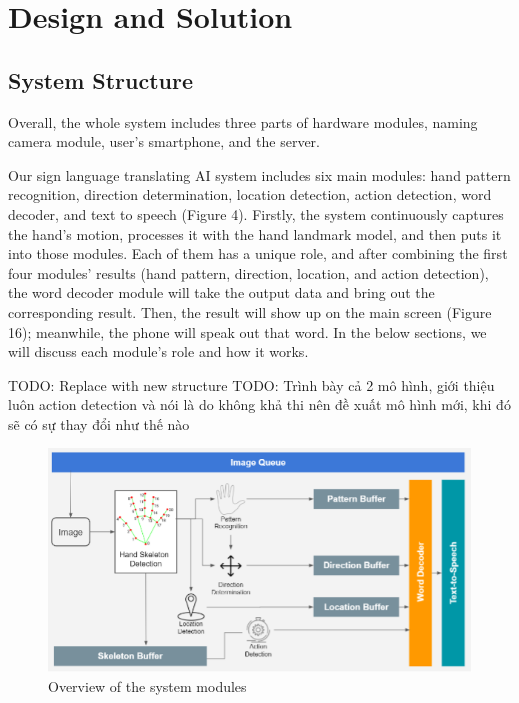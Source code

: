 \chapter{Design and Solution}

\section{System Structure}

Overall, the whole system includes three parts of hardware modules, naming camera module, user's smartphone, and the server.

Our sign language translating AI system includes six main modules: hand pattern recognition, direction determination, location detection, action detection, word decoder, and text to speech (Figure 4). Firstly, the system continuously captures the hand’s motion, processes it with the hand landmark model, and then puts it into those modules. Each of them has a unique role, and after combining the first four modules’ results (hand pattern, direction, location, and action detection), the word decoder module will take the output data and bring out the corresponding result. Then, the result will show up on the main screen (Figure 16); meanwhile, the phone will speak out that word. In the below sections, we will discuss each module’s role and how it works.

TODO: Replace with new structure
TODO: Trình bày cả 2 mô hình, giới thiệu luôn action detection và nói là do không khả thi nên đề xuất mô hình mới, khi đó sẽ có sự thay đổi như thế nào 

\begin{figure}[H]
  \centering
  \includegraphics[width=\textwidth]{img/Chap4/OverviewOfTheSystemModules.png}
  \caption{Overview of the system modules}
  \label{fig:Chap4-OverviewOfTheSystemModules}
\end{figure}

